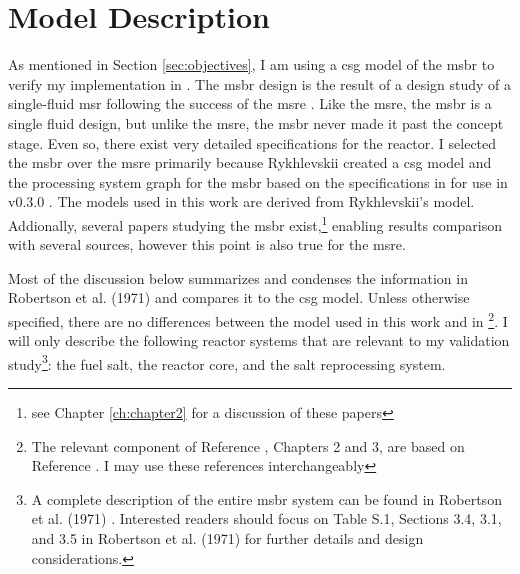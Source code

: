 \chapter{Model Description}
\label{ch:chapter4}
As mentioned in Section \ref{sec:objectives}, I am using a \Gls{csg} model of
the \Gls{msbr} \cite{robertson_conceptual_1971} to verify my \OpenMC
implementation in \SaltProc. The \Gls{msbr} design is the result of a
design study of a single-fluid \Gls{msr} following the success of the \Gls{msre}
\cite{haubenreich_experience_1970} \cite{rosenthal_history_1970}. Like the \Gls{msre},
the \Gls{msbr} is a single fluid design, but unlike the \Gls{msre}, the \Gls{msbr}
never made it past the concept stage. Even so, there exist very detailed specifications for
the reactor. I selected the \Gls{msbr} over the \Gls{msre} primarily because
Rykhlevskii created a \SerpentTWO \Gls{csg} model and the processing
system graph for the \Gls{msbr} based on the specifications in
\cite{robertson_conceptual_1971} for use in \SaltProc
v0.3.0 \cite{rykhlevskii_fuel_2020}. The models used in this work are derived
from Rykhlevskii's model. Addionally, several papers studying the
\Gls{msbr} exist,\footnote{see Chapter
\ref{ch:chapter2} for a discussion of these papers} enabling 
results comparison with several sources, however this point is
also true for the \Gls{msre}.

Most of the discussion below summarizes and condenses the information in
Robertson et al. (1971) and compares it to the \Gls{csg} model. Unless otherwise
specified, there are no differences between the model used in this work and in
\cite{rykhlevskii_fuel_2020}\footnote{The relevant component of Reference
\cite{rykhlevskii_fuel_2020}, Chapters 2 and 3, are based on Reference
\cite{rykhlevskii_modeling_2019}. I may use these references interchangeably}. I
will only describe the following reactor systems that are relevant to my
validation study\footnote{A complete description of the entire \Gls{msbr} system
can be found in Robertson et al. (1971) \cite{robertson_conceptual_1971}.
Interested readers should focus on Table S.1, Sections 3.4, 3.1, and 3.5 in
Robertson et al. (1971) for further details and design considerations.}: the
fuel salt, the reactor core, and the salt reprocessing system.

